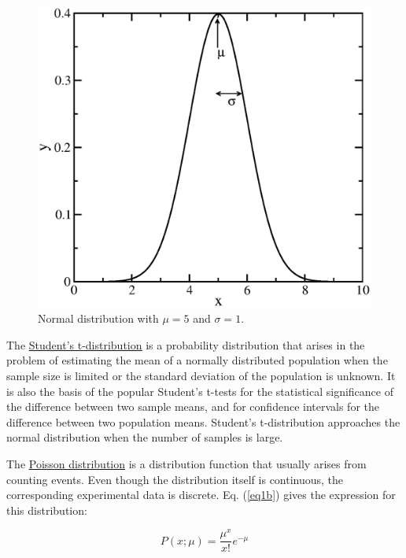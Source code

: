 \documentclass[byrevtex,amssymb,aps,pra,floatfix,letterpaper]{revtex4}
\begin{document}
\begin{figure}[!htp]
\vspace{0.5cm}
\begin{center}
\includegraphics[scale=0.4]{figgauss}
\caption{Normal distribution with $\mu = 5$ and $\sigma = 1$.}
\label{figgauss}
\end{center}
\end{figure}

The \href{http://en.wikipedia.org/wiki/Student's_t-distribution}{\underline{Student's t-distribution}} is a probability distribution that arises in the problem of estimating the mean of a normally distributed population when the sample size is limited or the standard deviation of the population is unknown. It is also the basis of the popular Student's t-tests for the statistical significance of the difference between two sample means, and for confidence intervals for the difference between two population means. Student's t-distribution approaches the normal distribution when the number of samples is large.

The \href{http://en.wikipedia.org/wiki/Poisson_distribution}{\underline{Poisson distribution}} is a distribution function that usually arises from counting events. Even though the distribution itself is continuous, the corresponding experimental data is discrete. Eq. (\ref{eq1b}) gives the expression for this distribution:

\begin{equation}
\label{eq1b}
P(x; \mu) = \frac{\mu^x}{x!}e^{-\mu}
\end{equation}
\end{document}

